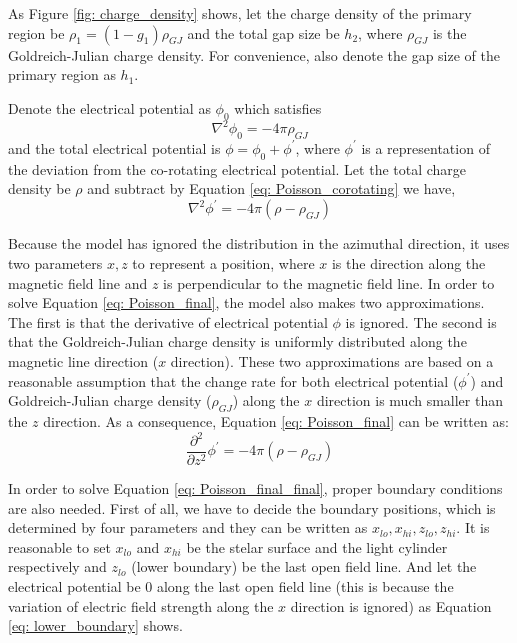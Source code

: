 \documentclass[12pt]{report}
\newcommand{\gj}[0]{
  Goldreich-Julian charge density
}
\newcommand{\myComment}[1]{
  \newline
}
\begin{document}
        As Figure \ref{fig: charge_density} shows, 
        let the charge density of the primary region be $\rho_1 = (1-g_{1}) \rho_{GJ}$ and 
        the total gap size be
        $h_{2}$, where $\rho_{GJ}$ is the Goldreich-Julian charge density. For convenience, 
        also denote the gap size of the primary region as $h_{1}$. 
        \myComment{Then we can calculate electric potential and electric field by solving the 
        Poisson equation }
        Denote the electrical potential as $\phi_{0}$ which satisfies 
        \begin{equation}
          \label{eq: Poisson_corotating}
          \nabla^{2}\phi_{0} = -4\pi\rho_{GJ}
        \end{equation}
        and the total electrical potential is $\phi = \phi_{0} + \phi^{\prime}$, 
        where $\phi^{\prime}$ is a representation of the deviation from the co-rotating 
        electrical potential. Let the total charge density be $\rho$ and subtract by
        Equation \ref{eq: Poisson_corotating} we have,
        \begin{equation}
          \label{eq: Poisson_final}
          \nabla^{2}\phi^{\prime} = -4\pi\left(\rho - \rho_{GJ} \right)
        \end{equation}

      Because the model has ignored the distribution in the azimuthal direction, it uses two 
      parameters $x, z$ to represent a position, where $x$ is the direction along the magnetic 
      field line and $z$ is perpendicular to the magnetic field line. In order to solve 
      Equation \ref{eq: Poisson_final}, the model also makes two approximations. The first is that 
      the derivative of electrical potential $\phi$ is ignored. The second is that the \gj{} 
      is uniformly distributed along the magnetic line direction ($x$ direction). These two 
      approximations are based on a reasonable assumption that the change rate 
      for both electrical potential ($\phi^{\prime}$) and \gj{}($\rho_{GJ}$) along the $x$ 
      direction is much smaller than the $z$ direction. 
      As a consequence, Equation \ref{eq: Poisson_final} can be written as: 
      \begin{equation}
        \label{eq: Poisson_final_final}
        \frac{\partial^2}{\partial z^2} \phi^{\prime} = -4\pi\left(\rho - \rho_{GJ} \right)
      \end{equation}

      In order to solve Equation \ref{eq: Poisson_final_final}, proper boundary conditions are also 
      needed. First of all, we have to decide the boundary positions, which is determined by 
      four parameters and they can be written as $x_{lo}, x_{hi}, z_{lo}, z_{hi}$. It is 
      reasonable to set $x_{lo}$ and $x_{hi}$ be the stelar surface and the light cylinder 
      respectively and $z_{lo}$ (lower boundary) be the last open field line. And let the 
      electrical potential be $0$ along the last open field line (this is because the 
      variation of electric field strength along the $x$ direction is ignored) as Equation 
      \ref{eq: lower_boundary} shows.  
\end{document}
